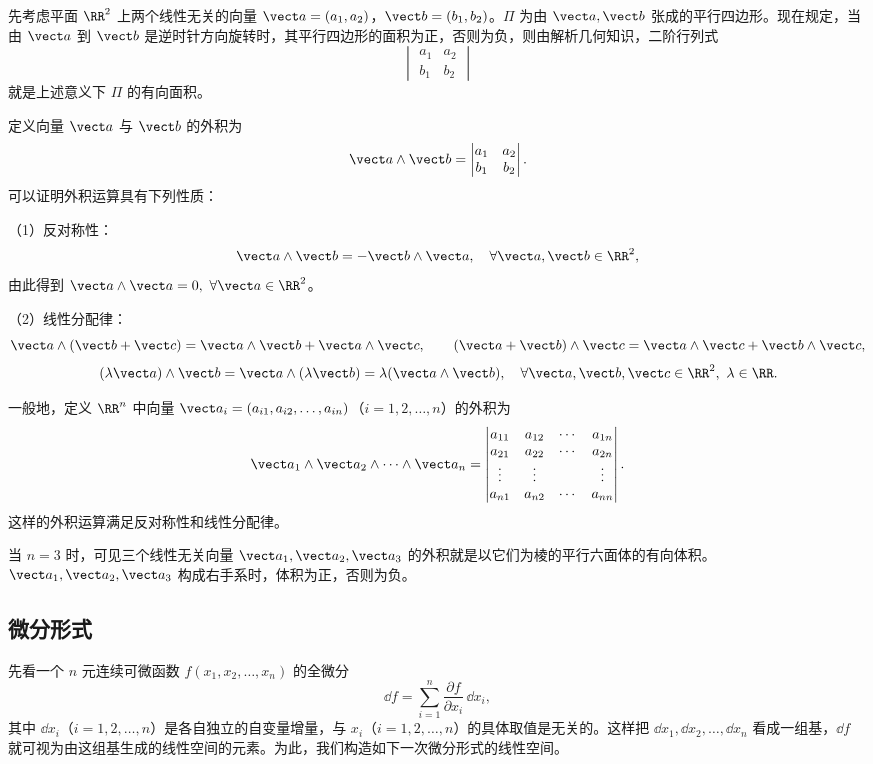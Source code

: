 先考虑平面 $\RR^2$ 上两个线性无关的向量 $\vect a=(a_1,a_2)$，$\vect b=(b_1,b_2)$。$\Pi$ 为由 $\vect a,\vect b$ 张成的平行四边形。现在规定，当由 $\vect a$ 到 $\vect b$ 是逆时针方向旋转时，其平行四边形的面积为正，否则为负，则由解析几何知识，二阶行列式
\[
  \begin{vmatrix}a_1&a_2\\b_1&b_2\end{vmatrix}
\]
就是上述意义下 $\Pi$ 的有向面积。

定义向量 $\vect a$ 与 $\vect b$ 的外积为
\[
  \vect a\wedge\vect b=
  \begin{vmatrix}a_1&a_2\\b_1&b_2\end{vmatrix}.
\]
可以证明外积运算具有下列性质：

（1）反对称性：
\[
  \vect a\wedge\vect b=-\vect b\wedge\vect a,\quad\forall\vect a,\vect b\in\RR^2,
\]
由此得到 $\vect a\wedge\vect a=0,\ \forall\vect a\in\RR^2$。

（2）线性分配律：
\[
  \vect a\wedge(\vect b+\vect c)=\vect a\wedge\vect b+\vect a\wedge\vect c,
  \qquad
  (\vect a+\vect b)\wedge\vect c=\vect a\wedge\vect c+\vect b\wedge\vect c,
\]
\[
  (\lambda\vect a)\wedge\vect b=\vect a\wedge(\lambda\vect b)=\lambda(\vect a\wedge\vect b),
  \quad\forall\vect a,\vect b,\vect c\in\RR^2,\ \lambda\in\RR.
\]

一般地，定义 $\RR^n$ 中向量 $\vect a_i=(a_{i1},a_{i2},\ldots,a_{in})$（$i=1,2,\ldots,n$）的外积为
\[
  \vect a_1\wedge\vect a_2\wedge\cdots\wedge\vect a_n=
  \begin{vmatrix}
  a_{11}&a_{12}&\cdots&a_{1n}\\
  a_{21}&a_{22}&\cdots&a_{2n}\\
  \vdots&\vdots&&\vdots\\
  a_{n1}&a_{n2}&\cdots&a_{nn}
  \end{vmatrix}.
\]
这样的外积运算满足反对称性和线性分配律。

当 $n=3$ 时，可见三个线性无关向量 $\vect a_1,\vect a_2,\vect a_3$ 的外积就是以它们为棱的平行六面体的有向体积。$\vect a_1,\vect a_2,\vect a_3$ 构成右手系时，体积为正，否则为负。

\subsection{微分形式}

先看一个 $n$ 元连续可微函数 $f(x_1,x_2,\ldots,x_n)$ 的全微分
\[
  \dd f=\sum_{i=1}^n\frac{\partial f}{\partial x_i}\,\dd x_i,
\]
其中 $\dd x_i$（$i=1,2,\ldots,n$）是各自独立的自变量增量，与 $x_i$（$i=1,2,\ldots,n$）的具体取值是无关的。这样把 $\dd x_1,\dd x_2,\ldots,\dd x_n$ 看成一组基，$\dd f$ 就可视为由这组基生成的线性空间的元素。为此，我们构造如下一次微分形式的线性空间。

